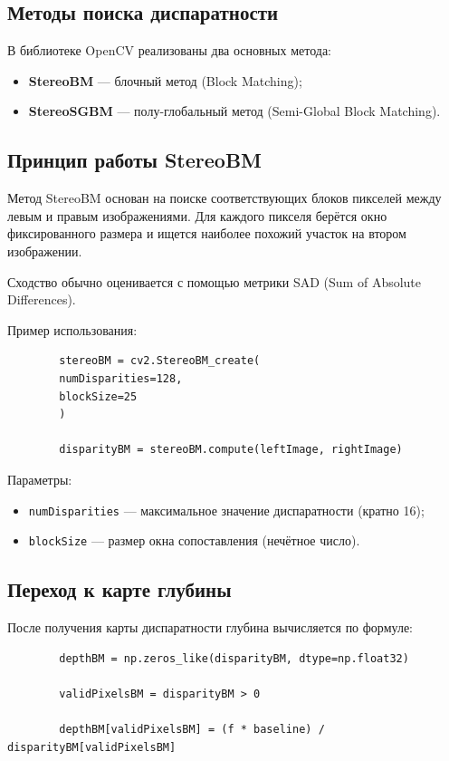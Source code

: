 	\subsection{Методы поиска диспаратности}
	
	В библиотеке OpenCV реализованы два основных метода:
	\begin{itemize}
		\item \textbf{StereoBM} — блочный метод (Block Matching);
		\item \textbf{StereoSGBM} — полу-глобальный метод (Semi-Global Block Matching).
	\end{itemize}
	
	\subsection{Принцип работы StereoBM}
	
	Метод StereoBM основан на поиске соответствующих блоков пикселей между левым и правым изображениями.  
	Для каждого пикселя берётся окно фиксированного размера и ищется наиболее похожий участок на втором изображении.
	
	Сходство обычно оценивается с помощью метрики SAD (Sum of Absolute Differences).
	
	Пример использования:
	
	\begin{lstlisting}
		stereoBM = cv2.StereoBM_create(
		numDisparities=128, 
		blockSize=25
		)
		
		disparityBM = stereoBM.compute(leftImage, rightImage)
	\end{lstlisting}
	
	Параметры:
	\begin{itemize}
		\item \texttt{numDisparities} — максимальное значение диспаратности (кратно 16);
		\item \texttt{blockSize} — размер окна сопоставления (нечётное число).
	\end{itemize}
	
	\subsection{Переход к карте глубины}
	
	После получения карты диспаратности глубина вычисляется по формуле:
	
	\begin{lstlisting}
		depthBM = np.zeros_like(disparityBM, dtype=np.float32)
		
		validPixelsBM = disparityBM > 0
		
		depthBM[validPixelsBM] = (f * baseline) / disparityBM[validPixelsBM]
	\end{lstlisting}
	
